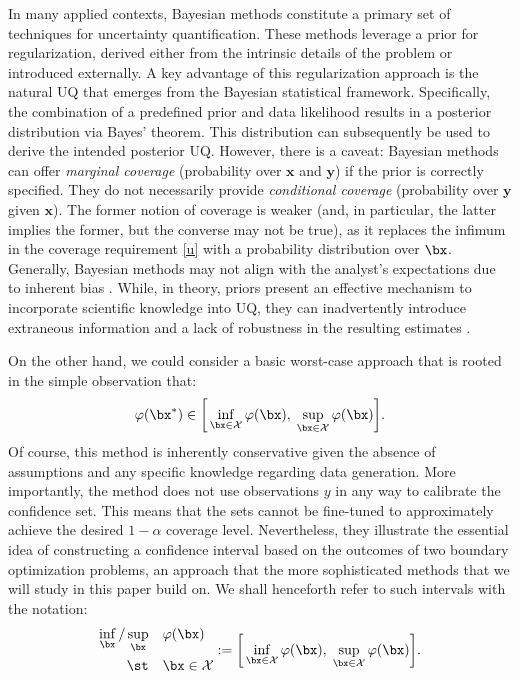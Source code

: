 \documentclass[11pt]{article}
\numberwithin{equation}{section}
\numberwithin{figure}{section}
\begin{document}
In many applied contexts, Bayesian methods constitute a primary set of techniques for uncertainty quantification. 
These methods leverage a prior for regularization, derived either from the intrinsic details of the problem or introduced externally. 
A key advantage of this regularization approach is the natural UQ that emerges from the Bayesian statistical framework. 
Specifically, the combination of a predefined prior and data likelihood results in a posterior distribution via Bayes' theorem. 
This distribution can subsequently be used to derive the intended posterior UQ. 
However, there is a caveat:
Bayesian methods can offer \emph{marginal coverage} (probability over $\bm{x}$ and $\bm{y}$) if the prior is correctly specified.
They do not necessarily provide \emph{conditional coverage} (probability over $\bm{y}$ given $\bm{x}$).
The former notion of coverage is weaker (and, in particular, the latter implies the former, but the converse may not be true), as it replaces the infimum in the coverage requirement \eqref{u} with a probability distribution over $\bx$.
Generally, Bayesian methods may not align with the analyst's expectations due to inherent bias \cite{kuusela_phd_thesis, patil}.
While, in theory, priors present an effective mechanism to incorporate scientific knowledge into UQ, they can inadvertently introduce extraneous information \cite{stark_constraints_priors} and a lack of robustness in the resulting estimates \cite{owhadi2015brittlenessb,owhadi2015brittlenessa, owhadi2017qualitative}.

On the other hand, we could consider a basic worst-case approach that is rooted in the simple observation that: 
\begin{equation}\label{worst_case}
    \varphi(\bx^*) \in \bigg[ \inf_{\bx \in \mathcal X} \varphi(\bx), \; \sup_{\bx \in \mathcal X} \varphi(\bx) \bigg].
\end{equation}
Of course, this method is inherently conservative given the absence of assumptions and any specific knowledge regarding data generation.
More importantly, the method does not use observations $y$ in any way to calibrate the confidence set.
This means that the sets cannot be fine-tuned to approximately achieve the desired $1 - \alpha$ coverage level.
Nevertheless, they illustrate the essential idea of constructing a confidence interval based on the outcomes of two boundary optimization problems, an approach that the more sophisticated methods that we will study in this paper build on.
We shall henceforth refer to such intervals with the notation: 
\begin{equation*}
\begin{aligned}
\inf_{\bx}/\sup_{\bx} \quad & \varphi(\bx) \\
\st \quad & \bx \in \mathcal X 
\end{aligned} := \bigg [ \inf_{\bx \in \mathcal X} \varphi(\bx), \; \sup_{\bx \in \mathcal X} \varphi(\bx) \bigg ].
\end{equation*}
\end{document}

